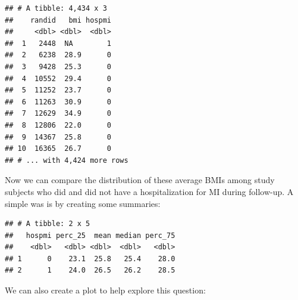 \documentclass[
]{book}
\newenvironment{Shaded}{\begin{snugshade}}{\end{snugshade}}
\newcommand{\DataTypeTok}[1]{\textcolor[rgb]{0.13,0.29,0.53}{#1}}
\newcommand{\DecValTok}[1]{\textcolor[rgb]{0.00,0.00,0.81}{#1}}
\newcommand{\FloatTok}[1]{\textcolor[rgb]{0.00,0.00,0.81}{#1}}
\newcommand{\KeywordTok}[1]{\textcolor[rgb]{0.13,0.29,0.53}{\textbf{#1}}}
\newcommand{\NormalTok}[1]{#1}
\newcommand{\OperatorTok}[1]{\textcolor[rgb]{0.81,0.36,0.00}{\textbf{#1}}}
\newcommand{\OtherTok}[1]{\textcolor[rgb]{0.56,0.35,0.01}{#1}}
\newcommand{\StringTok}[1]{\textcolor[rgb]{0.31,0.60,0.02}{#1}}
\begin{document}
\begin{verbatim}
## # A tibble: 4,434 x 3
##    randid   bmi hospmi
##     <dbl> <dbl>  <dbl>
##  1   2448  NA        1
##  2   6238  28.9      0
##  3   9428  25.3      0
##  4  10552  29.4      0
##  5  11252  23.7      0
##  6  11263  30.9      0
##  7  12629  34.9      0
##  8  12806  22.0      0
##  9  14367  25.8      0
## 10  16365  26.7      0
## # ... with 4,424 more rows
\end{verbatim}

Now we can compare the distribution of these average BMIs among study subjects who did and did not have a hospitalization for MI during follow-up. A simple was is by creating some summaries:

\begin{Shaded}
\end{Shaded}

\begin{verbatim}
## # A tibble: 2 x 5
##   hospmi perc_25  mean median perc_75
##    <dbl>   <dbl> <dbl>  <dbl>   <dbl>
## 1      0    23.1  25.8   25.4    28.0
## 2      1    24.0  26.5   26.2    28.5
\end{verbatim}

We can also create a plot to help explore this question:

\begin{Shaded}
\end{Shaded}
\end{document}
